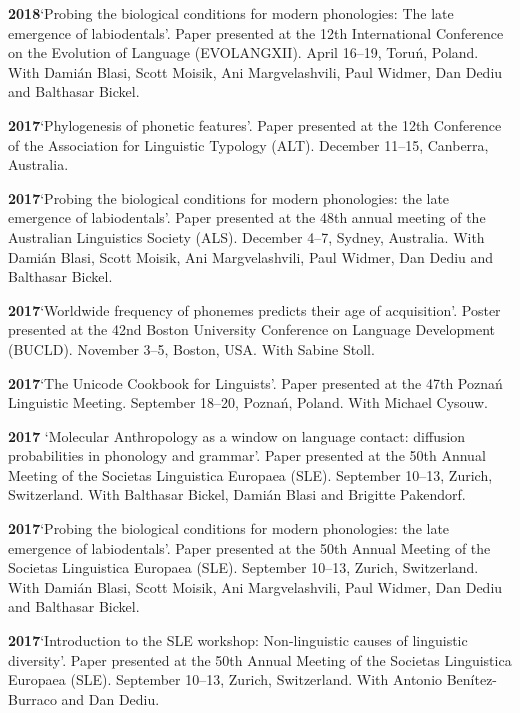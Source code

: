 \documentclass[11pt]{article}
\newcommand{\hangpara}{
 \setlength{\parindent}{0in} %
 \hangindent=0.42in %
}
\begin{document}
\vskip 6pt
\hangpara
{\bf 2018}\hspace{1ex}`Probing the biological conditions for modern phonologies: The late emergence of labiodentals'. Paper presented at the 12th International Conference on the Evolution of Language (EVOLANGXII). April 16--19, Toru{\'n}, Poland. With Dami{\'a}n Blasi, Scott Moisik, Ani Margvelashvili, Paul Widmer, Dan Dediu and Balthasar Bickel.

\vskip 6pt
\hangpara
{\bf 2017}\hspace{1ex}`Phylogenesis of phonetic features'. Paper presented at the 12th Conference of the Association for Linguistic Typology (ALT). December 11--15, Canberra, Australia.

\vskip 6pt
\hangpara
{\bf 2017}\hspace{1ex}`Probing the biological conditions for modern phonologies: the late emergence of labiodentals'. Paper presented at the 48th annual meeting of the Australian Linguistics Society (ALS). December 4--7, Sydney, Australia. With Dami{\'a}n Blasi, Scott Moisik, Ani Margvelashvili, Paul Widmer, Dan Dediu and Balthasar Bickel.

\vskip 6pt
\hangpara
{\bf 2017}\hspace{1ex}`Worldwide frequency of phonemes predicts their age of acquisition'. Poster presented at the 42nd Boston University Conference on Language Development (BUCLD). November 3--5, Boston, USA. With Sabine Stoll.

\vskip 6pt
\hangpara
{\bf 2017}\hspace{1ex}`The Unicode Cookbook for Linguists'. Paper presented at the 47th Pozna{\'n} Linguistic Meeting. September 18--20, Pozna{\'n}, Poland. With Michael Cysouw. 

\vskip 6pt
\hangpara
{\bf 2017}\hspace{1ex} `Molecular Anthropology as a window on language contact: diffusion probabilities in phonology and grammar'. Paper presented at the 50th Annual Meeting of the Societas Linguistica Europaea (SLE). September 10--13, Zurich, Switzerland. With Balthasar Bickel, Dami{\'a}n Blasi and Brigitte Pakendorf.
 
\vskip 6pt
\hangpara
{\bf 2017}\hspace{1ex}`Probing the biological conditions for modern phonologies: the late emergence of labiodentals'. Paper presented at the 50th Annual Meeting of the Societas Linguistica Europaea (SLE). September 10--13, Zurich, Switzerland. With Dami{\'a}n Blasi, Scott Moisik, Ani Margvelashvili, Paul Widmer, Dan Dediu and Balthasar Bickel.
\vskip 6pt
\hangpara
{\bf 2017}\hspace{1ex}`Introduction to the SLE workshop: Non-linguistic causes of linguistic diversity'. Paper presented at the 50th Annual Meeting of the Societas Linguistica Europaea (SLE). September 10--13, Zurich, Switzerland. With Antonio Benítez-Burraco and Dan Dediu.
\end{document}
